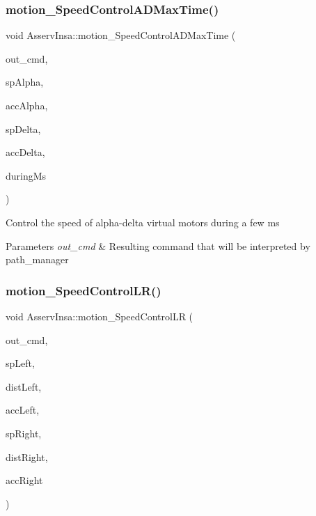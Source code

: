 \subsubsection{\texorpdfstring{motion\+\_\+\+Speed\+Control\+A\+D\+Max\+Time()}{motion\_SpeedControlADMaxTime()}}
{\footnotesize\ttfamily void Asserv\+Insa\+::motion\+\_\+\+Speed\+Control\+A\+D\+Max\+Time (\begin{DoxyParamCaption}\item[{\hyperlink{structRobotCommand}{Robot\+Command} $\ast$}]{out\+\_\+cmd,  }\item[{float}]{sp\+Alpha,  }\item[{float}]{acc\+Alpha,  }\item[{float}]{sp\+Delta,  }\item[{float}]{acc\+Delta,  }\item[{int}]{during\+Ms }\end{DoxyParamCaption})}

Control the speed of alpha-\/delta virtual motors during a few ms 
\begin{DoxyParams}{Parameters}
{\em out\+\_\+cmd} & Resulting command that will be interpreted by path\+\_\+manager \\
\hline
\end{DoxyParams}
\mbox{\label{classAsservInsa_ae70a0eb3fe9dab42d6fa1537ddcb6b8b}} 
\subsubsection{\texorpdfstring{motion\+\_\+\+Speed\+Control\+L\+R()}{motion\_SpeedControlLR()}}
{\footnotesize\ttfamily void Asserv\+Insa\+::motion\+\_\+\+Speed\+Control\+LR (\begin{DoxyParamCaption}\item[{\hyperlink{structRobotCommand}{Robot\+Command} $\ast$}]{out\+\_\+cmd,  }\item[{float}]{sp\+Left,  }\item[{float}]{dist\+Left,  }\item[{float}]{acc\+Left,  }\item[{float}]{sp\+Right,  }\item[{float}]{dist\+Right,  }\item[{float}]{acc\+Right }\end{DoxyParamCaption})}

